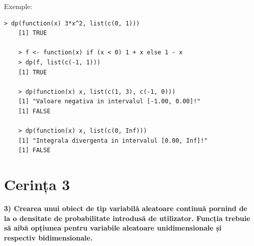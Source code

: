 \documentclass[12pt]{article}
\begin{document}
Exemple:
\begin{lstlisting}[numbers=none]
	> dp(function(x) 3*x^2, list(c(0, 1)))
	[1] TRUE
	
	> f <- function(x) if (x < 0) 1 + x else 1 - x
	> dp(f, list(c(-1, 1)))
	[1] TRUE
	
	> dp(function(x) x, list(c(1, 3), c(-1, 0)))
	[1] "Valoare negativa in intervalul [-1.00, 0.00]!"
	[1] FALSE
	
	> dp(function(x) x, list(c(0, Inf)))
	[1] "Integrala divergenta in intervalul [0.00, Inf]!"
	[1] FALSE
\end{lstlisting} \pagebreak

	\section{Cerința 3}
\textbf{3) Crearea unui obiect de tip variabilă aleatoare continuă pornind de la o densitate de
	probabilitate introdusă de utilizator. Funcția trebuie să aibă opțiunea pentru variabile
	aleatoare unidimensionale și respectiv bidimensionale.}\vspace{5mm}
\end{document}

